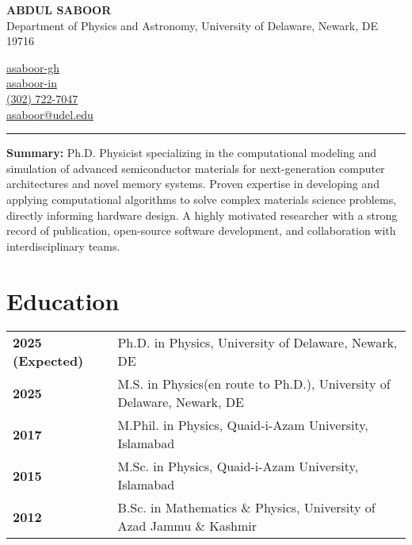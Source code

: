 \documentclass[letter,11pt]{article}
\begin{document}
\begin{minipage}{0.65\textwidth}
    \raggedright
    {\Large \textbf{ABDUL SABOOR}} \\ 
    Department of Physics and Astronomy, University of Delaware, Newark, DE 19716 
\end{minipage}
\hfill
\begin{minipage}{0.3\textwidth}
    \raggedright
    \faGithub \quad \href{https://github.com/asaboor-gh}{asaboor-gh}\\
    \faLinkedin \quad \href{https://linkedin.com/in/asaboor-in}{asaboor-in} \\
    \faPhone \quad \href{tel:+13027227047}{(302) 722-7047} \\
    \faEnvelope \quad \href{mailto:asaboor@udel.edu}{asaboor@udel.edu}
\end{minipage}
\vspace{2mm}
\hrule
\vspace{4mm} 

\noindent
\textbf{Summary:} Ph.D. Physicist specializing in the computational modeling and simulation of advanced semiconductor materials for next-generation computer architectures and novel memory systems. Proven expertise in developing and applying computational algorithms to solve complex materials science problems, directly informing hardware design. A highly motivated researcher with a strong record of publication, open-source software development, and collaboration with interdisciplinary teams.

\section{Education}
\begin{tabular}{p{3.25cm} p{12cm}}
    \textbf{2025 (Expected)} & Ph.D. in Physics, University of Delaware, Newark, DE \\
    \textbf{2025} & M.S. in Physics(en route to Ph.D.), University of Delaware, Newark, DE \\
    \textbf{2017} & M.Phil. in Physics, Quaid-i-Azam University, Islamabad \\
    \textbf{2015} & M.Sc. in Physics, Quaid-i-Azam University, Islamabad \\
    \textbf{2012} & B.Sc. in Mathematics \& Physics, University of Azad Jammu \& Kashmir \\
\end{tabular}
\end{document}
